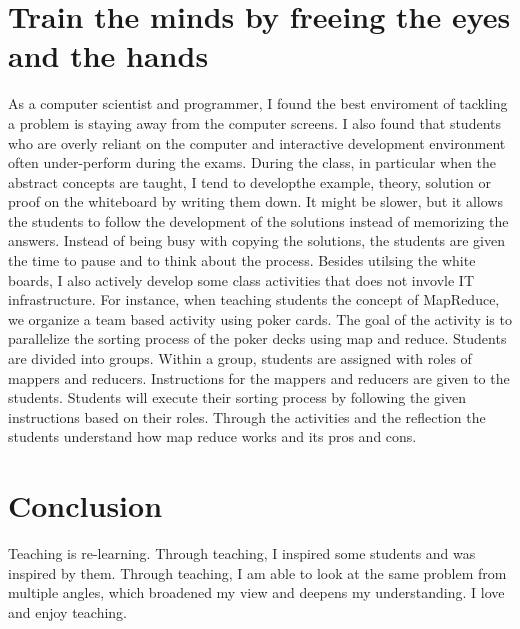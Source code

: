 \documentclass[12pt]{article}
\theoremstyle{plain} \numberwithin{equation}{section}
\theoremstyle{definition}
\begin{document}
\section{Train the minds by freeing the eyes and the hands}
As a computer scientist and programmer, I found the best enviroment
of tackling a problem is staying away from the computer screens. I
also found that students who are overly reliant on the computer and
interactive development environment often under-perform during the
exams. During the class, in particular when the abstract concepts are
taught, I tend to developthe example, theory, solution or proof on
the whiteboard by writing them down. It might be slower, but it allows 
the students to follow the development of the
solutions instead of memorizing the answers. Instead of being busy with copying
the solutions, the students are given the time to pause and to think about the
process. Besides utilsing the white boards, I also actively develop
some class activities that does not invovle IT infrastructure. For
instance, when teaching students the concept of MapReduce, we organize
a team based activity using poker cards. The goal of the activity is to parallelize the
sorting process of the poker decks using  map and reduce. 
Students are divided into groups. Within a group, students are assigned with roles of
mappers and reducers. Instructions for the mappers and reducers are
given to the students. Students will execute their sorting process by
following the given instructions based on their
roles. Through the activities and the reflection the students understand
how map reduce works and its pros and cons. 

\section{Conclusion}
Teaching is re-learning. Through teaching, I inspired some
students and was inspired by them. Through teaching, I am able to look at
the same problem from multiple angles, which broadened my view and deepens my
understanding. I love and enjoy teaching. 
\end{document}
